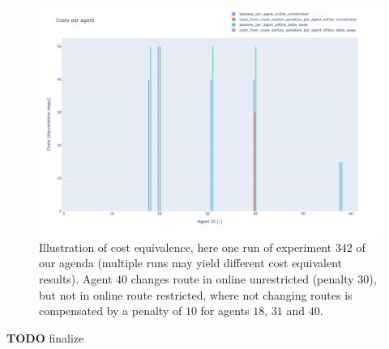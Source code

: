\documentclass{article}
\begin{document}
\begin{figure}[hbtp]
    \includegraphics[width=\textwidth]{Figures/05_use_cases/costs_experiment_342.pdf}
	\caption{Illustration of cost equivalence, here one run of experiment $342$ of our agenda (multiple runs may yield different cost equivalent results). Agent $40$ changes route in online unrestricted (penalty $30$), but not in online route restricted, where not changing routes is compensated by a penalty of $10$ for agents  $18$, $31$ and $40$.}
	\label{fig:cost_equivalence_342}
\end{figure}

\begin{mdframed}
{\bf TODO } finalize
\end{mdframed}
\end{document}
